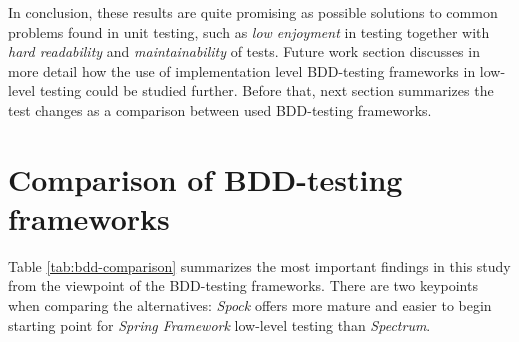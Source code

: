 In conclusion, these results are quite promising as possible solutions to common problems found in unit testing, such as \textit{low enjoyment} in testing
together with \textit{hard readability} and \textit{maintainability} of tests. Future work section discusses in more detail
how the use of implementation level BDD-testing frameworks in low-level testing could be studied further. Before that,
next section summarizes the test changes as a comparison between used BDD-testing frameworks.

\section{Comparison of BDD-testing frameworks}
{\renewcommand{\arraystretch}{1.3}
\begin{table}[H]
        \caption {Summary of studied aspects of low-level testing with BDD frameworks } \label{tab:bdd-comparison}
\end{table}
}

Table \ref{tab:bdd-comparison} summarizes the most important findings in this study from the viewpoint of the
BDD-testing frameworks. There are two keypoints when comparing the alternatives: \textit{Spock} offers more mature
and easier to begin starting point for \textit{Spring Framework} low-level testing than \textit{Spectrum}.

